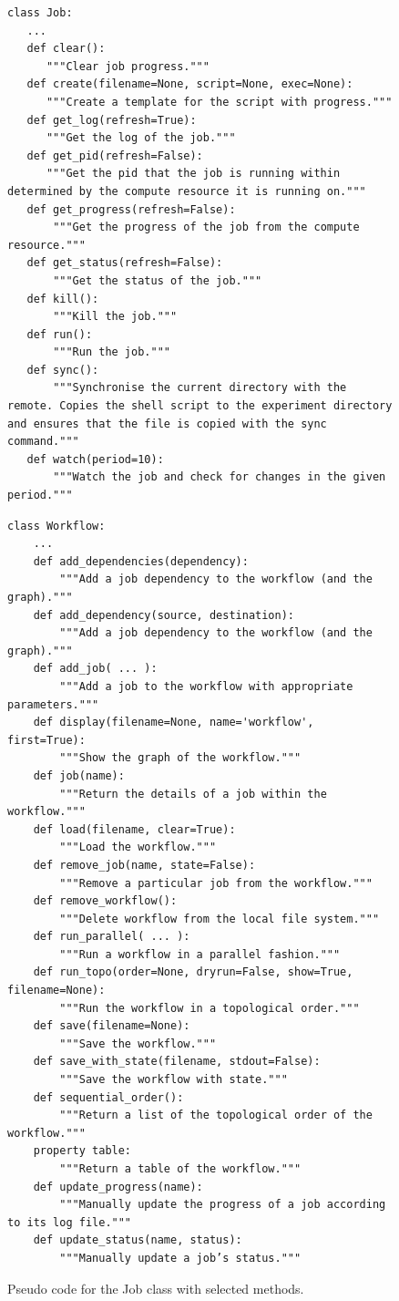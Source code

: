 \documentclass[sigplan,screen]{acmart}
\begin{document}
\begin{figure}[!h]
\begin{verbatim}
class Job:
   ...
   def clear():
      """Clear job progress."""
   def create(filename=None, script=None, exec=None):
      """Create a template for the script with progress."""
   def get_log(refresh=True):
      """Get the log of the job."""
   def get_pid(refresh=False):
      """Get the pid that the job is running within determined by the compute resource it is running on."""
   def get_progress(refresh=False):
       """Get the progress of the job from the compute resource."""
   def get_status(refresh=False):
       """Get the status of the job."""
   def kill():
       """Kill the job."""
   def run():
       """Run the job."""
   def sync():
       """Synchronise the current directory with the remote. Copies the shell script to the experiment directory and ensures that the file is copied with the sync command."""
   def watch(period=10):
       """Watch the job and check for changes in the given period."""
\end{verbatim}
\caption{Pseudo code for the Job class with selected methods.}
\label{fig:code-job}

\bigskip

\begin{verbatim}
class Workflow:
    ...
    def add_dependencies(dependency):
        """Add a job dependency to the workflow (and the graph)."""
    def add_dependency(source, destination):
        """Add a job dependency to the workflow (and the graph)."""
    def add_job( ... ):
        """Add a job to the workflow with appropriate parameters."""
    def display(filename=None, name='workflow', first=True):
        """Show the graph of the workflow."""
    def job(name):
        """Return the details of a job within the workflow."""
    def load(filename, clear=True):
        """Load the workflow."""
    def remove_job(name, state=False):
        """Remove a particular job from the workflow."""
    def remove_workflow():
        """Delete workflow from the local file system."""
    def run_parallel( ... ):
        """Run a workflow in a parallel fashion."""
    def run_topo(order=None, dryrun=False, show=True, filename=None):
        """Run the workflow in a topological order."""
    def save(filename=None):
        """Save the workflow."""
    def save_with_state(filename, stdout=False):
        """Save the workflow with state."""
    def sequential_order():
        """Return a list of the topological order of the workflow."""
    property table:
        """Return a table of the workflow."""
    def update_progress(name):
        """Manually update the progress of a job according to its log file."""
    def update_status(name, status):
        """Manually update a job’s status."""
\end{verbatim}
\caption{Pseudo code for the Job class with selected methods.}
\label{fig:code-workflow}
\end{figure}
\end{document}
